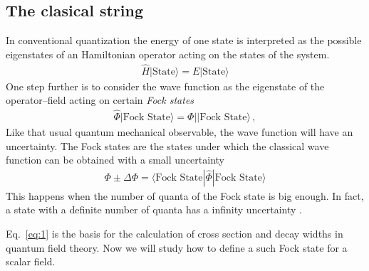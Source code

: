 \subsection{The clasical string}
\label{sec:clasical-string}
\begin{frame}
In conventional quantization the energy of one state is interpreted as the possible eigenstates of an Hamiltonian operator acting on the states of the system. 
\begin{align}
  \widehat{H}|\text{State}\rangle=E|\text{State}\rangle
\end{align}
One step further is to consider the wave function as the eigenstate  of the operator--field acting on certain \emph{Fock states}
\begin{align}
\label{eq:1}
  \widehat{\Phi}|\text{Fock State}\rangle=\Phi||\text{Fock State}\rangle\,,
\end{align}
Like that usual quantum mechanical observable, the wave function will have an uncertainty. 
The Fock states are the states under which the classical wave function can be obtained with a small uncertainty
\begin{align}
    \Phi\pm\Delta\Phi=\langle\text{Fock State}|\widehat{\Phi}|\text{Fock State}\rangle
\end{align}
This happens when the number of quanta of the Fock state is big enough. In fact, a state with a definite number of quanta has a infinity uncertainty \cite{Gross:1993}.

Eq.~\eqref{eq:1} is the basis for the calculation of cross section and decay widths in quantum field theory. Now we will study how to define a such Fock state for a scalar field.



\end{frame}
